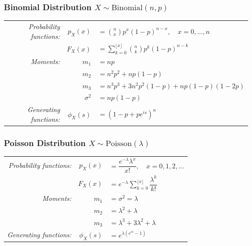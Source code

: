 \documentclass[11pt,a4paper]{article}
\theoremstyle{definition}
\begin{document}
\subsubsection*{Binomial Distribution $X \sim \text{Binomial}(n,p)$}
\begin{longtable}{r r l}
\textit{Probability functions:} & $p_X(x)$& $\displaystyle =\binom{n}{x}p^x(1-p)^{n-x}, \quad x=0,\dots,n$\vspace{0.2cm} \\
& $F_X(x)$& $=\displaystyle\sum_{k=0}^{\lfloor x\rfloor}\binom{n}{k}p^k(1-p)^{n-k}$\\
\textit{Moments:} & $m_1$ & $=np$\\
& $m_2$& $=n^2p^2+np(1-p)$\\
& $m_3$& $=n^3p^3+3n^2p^2(1-p)+np(1-p)(1-2p)$\\
& $\sigma^2$ & $=np(1-p)$\\
\textit{Generating functions:} & $\phi_X(s)$ & $=(1-p+pe^{is})^n$\\
\end{longtable}

\subsubsection*{Poisson Distribution $X \sim \text{Poisson}(\lambda)$}
\begin{longtable}{r r l}
\textit{Probability functions:} & $p_X(x)$ & $=\dfrac{e^{-\lambda}\lambda^x}{x!}, \quad x=0,1,2,\dots$\vspace{0.1cm} \\
& $F_X(x)$ & $=\displaystyle e^{-\lambda}\sum_{k=0}^{\lfloor x\rfloor}\dfrac{\lambda^k}{k!}$\\
\textit{Moments:} & $m_1$ & $= \sigma^2 =\lambda$\\
& $m_2$ & $=\lambda^2+\lambda$\\
& $m_3$ & $=\lambda^3+3\lambda^2+\lambda$\\
\textit{Generating functions:}
& $\phi_X(s)$ & $=e^{\lambda(e^{is}-1)}$\\
\end{longtable}

\end{document}
